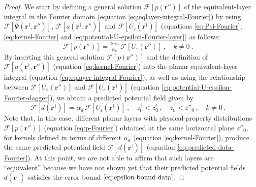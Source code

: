 \begin{proof}
	We start by defining a general solution $\mathcal{F} [ p(\mathbf{r}'') ]$ of the equivalent-layer 
	integral in the Fourier domain (equation \ref{eq:eqlayer-integral-Fourier}) 
	by using $\mathcal{F} [ \Psi(\mathbf{r}^{\dagger}, \mathbf{r}'') ]$, 
	$\mathcal{F} [ a(\mathbf{r}^{\dagger}, \mathbf{r}'') ]$ and 
	$\mathcal{F} \left[ U_{\varepsilon}(\mathbf{r}^{\dagger}) \right]$ 
	(equations \ref{eq:Psi-Fourier}, \ref{eq:kernel-Fourier} and \ref{eq:potential-U-epsilon-Fourier-layer})
	as follows:
	\begin{equation}
		\mathcal{F} [ p(\mathbf{r}'') ] =
		\tfrac{k \, \alpha_{d}}{\alpha_{a}} \,
		\mathcal{F} [ U_{\varepsilon}(\mathbf{r}'') ] \: ,
		\quad k \ne 0 \: .
		\label{eq:p-Fourier}
	\end{equation}
	By inserting this general solution $\mathcal{F} [ p(\mathbf{r}'') ]$ and the definition of 
	$\mathcal{F} [ a(\mathbf{r}^{\dagger}, \mathbf{r}'') ]$ (equation \ref{eq:kernel-Fourier}) 
	into the planar equivalent-layer integral (equation \ref{eq:eqlayer-integral-Fourier}), as well as  
	using the relationship between $\mathcal{F} [ U_{\varepsilon}(\mathbf{r}'') ]$ and 
	$\mathcal{F} [ U_{\varepsilon}(\mathbf{r}^{\dagger})]$ (equation \ref{eq:potential-U-epsilon-Fourier-dagger}), 
	we obtain a predicted potential field given by
	\begin{equation}
		\mathcal{F} [ d(\mathbf{r}^{\dagger}) ] = 
		\alpha_{d} \, \mathcal{F} [ U_{\varepsilon}(\mathbf{r}^{\dagger}) ] 
		\: , \quad z^{\dagger}_{0} < z^{t}_{0} \: , \quad z^{\dagger}_{0} < z''_{0} \: , \quad k \ne 0 \: .
		\label{eq:predicted-data-Fourier}
	\end{equation}
	Note that, in this case, different planar layers with physical-property distributions $\mathcal{F} [ p(\mathbf{r}'') ]$ 
	(equation \ref{eq:p-Fourier}) obtained at the same horizontal plane $z''_{0}$, for kernels defined in terms of different 
	$\alpha_{a}$ (equation \ref{eq:kernel-Fourier}),
	produce the same predicted potential field $\mathcal{F} [ d(\mathbf{r}^{\dagger}) ]$ (equation \ref{eq:predicted-data-Fourier}). 
	At this point, we are not able to affirm that such layers are ``equivalent'' because we have not shown yet that their
	predicted potential fields $d(\mathbf{r}^{\dagger})$ satisfies the error bound $\ref{eq:epsilon-bound-data}$.
	

\end{proof}
